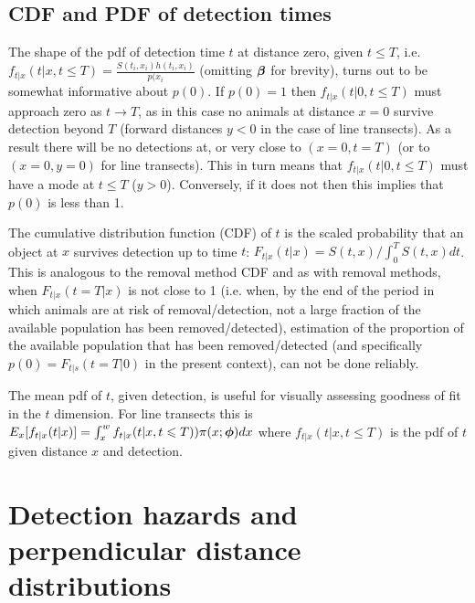 \documentclass[useAMS,usenatbib,referee]{biom}
\begin{document}
\subsection{CDF and PDF of detection times}

The shape of the pdf of detection time $t$ at distance zero, given $t\leq T$, i.e. $f_{t|x}(t|x,t\leq T)=\frac{S(t_i,x_i)h(t_i,x_i)}{p(x_i}$ (omitting $\mbox{\boldmath $\beta$}$ for brevity), turns out to be somewhat informative about $p(0)$. If $p(0)=1$ then $f_{t|x}(t|0,t\leq T)$ must approach zero as $t\rightarrow T$, as in this case no animals at distance $x=0$ survive detection beyond $T$ (forward distances $y<0$ in the case of line transects). As a result there will be no detections at, or very close to $(x=0,t=T)$ (or to $(x=0,y=0)$ for line transects). This in turn means that $f_{t|x}(t|0,t\leq T)$ must have a mode at $t\leq T$ ($y>0$). Conversely, if it does not then this implies that $p(0)$ is less than 1. 

The cumulative distribution function (CDF) of $t$ is the scaled probability that an object at $x$ survives detection up to time $t$: $F_{t|x}(t|x)=S(t,x)/\int_0^T S(t,x)dt$. This is analogous to the removal method CDF and as with removal methods, when $F_{t|x}(t=T|x)$ is not close to 1 (i.e. when, by the end of the period in which animals are at risk of removal/detection, not a large fraction of the available population has been removed/detected), estimation of the proportion of the available population that has been removed/detected (and specifically $p(0)=F_{t|s}(t=T|0)$ in the present context), can not be done reliably.

The mean pdf of $t$, given detection, is useful for visually assessing goodness of fit in the $t$ dimension. For line transects this is $E_x[f_{t|x}(t|x)]=\int_x^w f_{t|x}(t|x,t\leqslant T))\pi(x;\mbox{\boldmath $\phi$})dx$ where $f_{t|x}(t|x,t\leq T)$ is the pdf of $t$ given distance $x$ and detection. 


\section{Detection hazards and perpendicular distance distributions}
\end{document}
